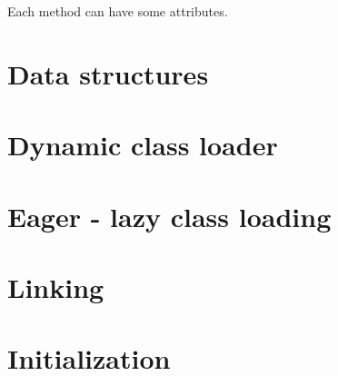 Each method can have some attributes.


\section{Data structures}

\section{Dynamic class loader}

\section{Eager - lazy class loading}

\section{Linking}

\section{Initialization}
